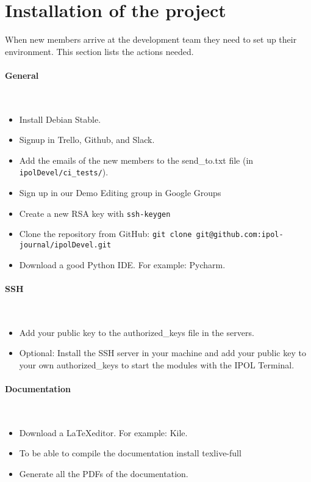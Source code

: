 \section{Installation of the project}
When new members arrive at the development team they need to set up their environment. This section lists the actions needed.

\paragraph{General} \hspace{0pt} \\
\begin{itemize}
    \item Install Debian Stable.
    \item Signup in Trello, Github, and Slack.
    \item Add the emails of the new members to the send\_to.txt file (in {\tt ipolDevel/ci\_tests/}).
    \item Sign up in our Demo Editing group in Google Groups
    \item Create a new RSA key with {\tt ssh-keygen}
    \item Clone the repository from GitHub: {\tt git clone git@github.com:ipol-journal/ipolDevel.git}
    \item Download a good Python IDE. For example: Pycharm.
\end{itemize}

\paragraph{SSH} \hspace{0pt} \\
\begin{itemize}
    \item Add your public key to the authorized\_keys file in the servers.
    \item Optional: Install the SSH server in your machine and add your public key to your own authorized\_keys to start the modules with the IPOL Terminal.
\end{itemize}

\paragraph{Documentation} \hspace{0pt} \\
\begin{itemize}
    \item Download a \LaTeX editor. For example: Kile.
    \item To be able to compile the documentation install texlive-full
    \item Generate all the PDFs of the documentation.
\end{itemize}

